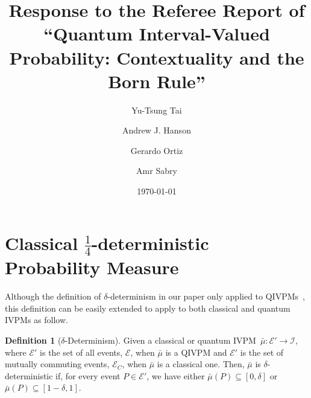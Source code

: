 \documentclass[english,reprint, aps, prl,superscriptaddress, showpacs,
showkeys, longbibliography, amsmath, amssymb, floatfix]{revtex4-1}
\theoremstyle{plain}
\theoremstyle{definition}
\newtheorem{definition}{Definition}
\newcommand{\events}{\ensuremath{\mathcal{E}}}
\newcommand{\eventsC}{\ensuremath{\events_{C}}}
\begin{document}
\title{Response to the Referee Report of ``Quantum Interval-Valued Probability:
Contextuality and the Born Rule''}

\author{Yu-Tsung Tai}



\author{Andrew J. Hanson}


\author{Gerardo Ortiz}


\author{Amr Sabry}


\date{\today}

\maketitle

\section{Classical \texorpdfstring{$\frac{1}{4}$}{¼}-deterministic Probability
Measure}

Although the definition of $\delta$-determinism in our paper only
applied to QIVPMs~\cite{THOS2017}, this definition can be easily
extended to apply to both classical and quantum IVPMs as follow.

\begin{definition}[$\delta$-Determinism]\label{def:delta-deterministic}
Given a classical or quantum IVPM~$\bar{\mu}:\events'\rightarrow\mathscr{I}$,
where $\events'$ is the set of all events, $\events$, when $\bar{\mu}$
is a QIVPM and $\events'$ is the set of mutually commuting events,
$\eventsC$, when $\bar{\mu}$ is a classical one. Then, $\bar{\mu}$
is $\delta$-deterministic if, for every event $P\in\events'$, we
have either $\bar{\mu}\left(P\right)\subseteq\left[0,\delta\right]$
or $\bar{\mu}\left(P\right)\subseteq\left[1-\delta,1\right]$. \end{definition}
\end{document}
